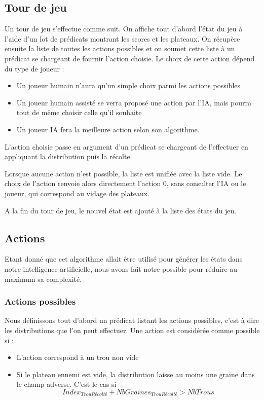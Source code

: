 \documentclass[]{article}
\begin{document}
\subsection{Tour de jeu}

Un tour de jeu s'effectue comme suit. On affiche tout d'abord l'état du jeu à l'aide d'un lot de prédicats montrant les scores et les plateaux. On récupère ensuite la liste de toutes les actions possibles et on soumet cette liste à un prédicat se chargeant de fournir l'action choisie. Le choix de cette action dépend du type de joueur : 
\begin{itemize}
\item Un joueur humain n'aura qu'un simple choix parmi les actions possibles
\item Un joueur humain assisté se verra proposé une action par l'IA, mais pourra tout de même choisir celle qu'il souhaite
\item Un joueur IA fera la meilleure action selon son algorithme.
\end{itemize}

L'action choisie passe en argument d'un prédicat se chargeant de l'effectuer en appliquant la distribution puis la récolte.

Lorsque aucune action n'est possible, la liste est unifiée avec la liste vide. Le choix de l'action renvoie alors directement l'action 0, sans consulter l'IA ou le joueur, qui correspond au vidage des plateaux.

A la fin du tour de jeu, le nouvel état est ajouté à la liste des états du jeu.

\subsection{Actions}

Etant donné que cet algorithme allait être utilisé pour générer les états dans notre intelligence artificielle, nous avons fait notre possible pour réduire au maximum sa complexité.

\subsubsection{Actions possibles}

Nous définissons tout d'abord un prédicat listant les actions possibles, c'est à dire les distributions que l'on peut effectuer. Une action est considérée comme possible si : 
\begin{itemize}
\item L'action correspond à un trou non vide
\item Si le plateau ennemi est vide, la distribution laisse au moins une graine dans le champ adverse. C'est le cas si 
$$Index_{TrouRécolté} + NbGraines_{TrouRécolté} > NbTrous$$
\end{itemize}
\end{document}
